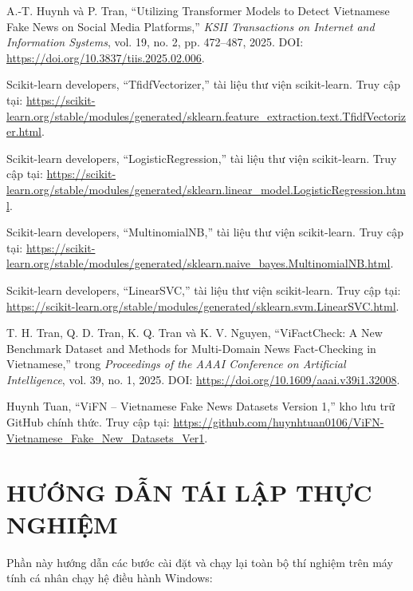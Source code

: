 \documentclass[12pt,a4paper]{report}
\begin{document}
\begin{enumerate}[label={[\arabic*]}, leftmargin=24pt]
  A.-T. Huynh và P. Tran, ``Utilizing Transformer Models to Detect Vietnamese Fake News on Social Media Platforms,'' \textit{KSII Transactions on Internet and Information Systems}, vol. 19, no. 2, pp. 472--487, 2025. DOI: \url{https://doi.org/10.3837/tiis.2025.02.006}.

  Scikit-learn developers, ``TfidfVectorizer,'' tài liệu thư viện scikit-learn. Truy cập tại: \url{https://scikit-learn.org/stable/modules/generated/sklearn.feature_extraction.text.TfidfVectorizer.html}.

  Scikit-learn developers, ``LogisticRegression,'' tài liệu thư viện scikit-learn. Truy cập tại: \url{https://scikit-learn.org/stable/modules/generated/sklearn.linear_model.LogisticRegression.html}.

  Scikit-learn developers, ``MultinomialNB,'' tài liệu thư viện scikit-learn. Truy cập tại: \url{https://scikit-learn.org/stable/modules/generated/sklearn.naive_bayes.MultinomialNB.html}.

  Scikit-learn developers, ``LinearSVC,'' tài liệu thư viện scikit-learn. Truy cập tại: \url{https://scikit-learn.org/stable/modules/generated/sklearn.svm.LinearSVC.html}.

  T. H. Tran, Q. D. Tran, K. Q. Tran và K. V. Nguyen, ``ViFactCheck: A New Benchmark Dataset and Methods for Multi-Domain News Fact-Checking in Vietnamese,'' trong \textit{Proceedings of the AAAI Conference on Artificial Intelligence}, vol. 39, no. 1, 2025. DOI: \url{https://doi.org/10.1609/aaai.v39i1.32008}.

  Huynh Tuan, ``ViFN -- Vietnamese Fake News Datasets Version 1,'' kho lưu trữ GitHub chính thức. Truy cập tại: \url{https://github.com/huynhtuan0106/ViFN-Vietnamese_Fake_New_Datasets_Ver1}.
\end{enumerate}

\clearpage
\appendix
\chapter{HƯỚNG DẪN TÁI LẬP THỰC NGHIỆM}

Phần này hướng dẫn các bước cài đặt và chạy lại toàn bộ thí nghiệm trên máy tính cá nhân chạy hệ điều hành Windows:
\end{document}
